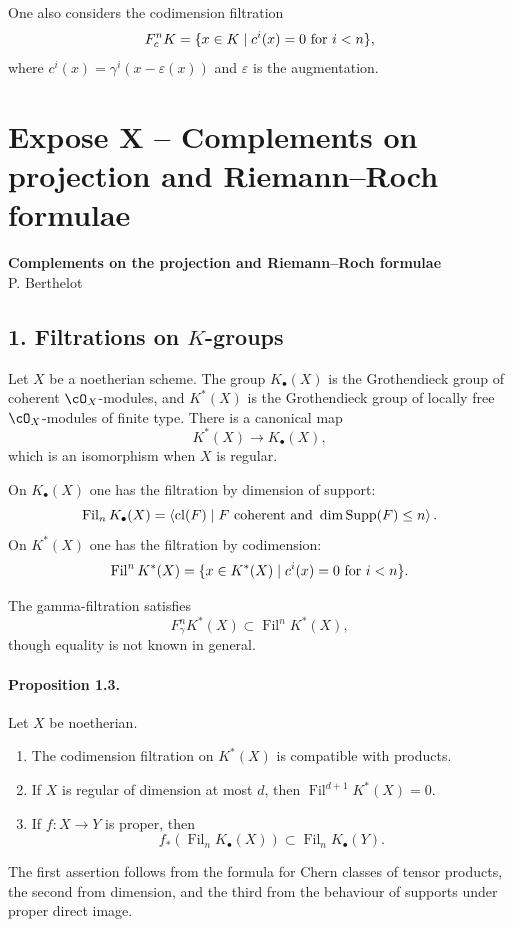 \documentclass[11pt]{article}
\theoremstyle{plain}
\theoremstyle{definition}
\theoremstyle{remark}
\DeclareMathOperator{\Supp}{Supp}
\DeclareMathOperator{\cl}{cl}
\newcommand{\longto}{\longrightarrow}
\providecommand{\eps}{\varepsilon}
\providecommand{\Filt}{\operatorname{Fil}}
\begin{document}
One also considers the codimension filtration
\[
F^n_cK=\{x\in K\mid c^i(x)=0\hbox{ for }i<n\},
\]
where $c^i(x)=\gamma^i(x-\eps(x))$ and $\eps$ is the augmentation.

\section*{Expose X -- Complements on projection and Riemann--Roch formulae}

\begin{center}
{\large\textbf{Complements on the projection and Riemann--Roch formulae}}\\[0.25em]
{\normalsize P. Berthelot}
\end{center}

\subsection*{1. Filtrations on $K$-groups}

Let $X$ be a noetherian scheme. The group $K_\bullet(X)$ is the Grothendieck group of coherent $\cO_X$-modules, and $K^*(X)$ is the Grothendieck group of locally free $\cO_X$-modules of finite type. There is a canonical map
\[
K^*(X)\longto K_\bullet(X),
\]
which is an isomorphism when $X$ is regular.

On $K_\bullet(X)$ one has the filtration by dimension of support:
\[
\Filt_nK_\bullet(X)=
\left\langle \cl(F)\mid F\hbox{ coherent and }\dim \Supp(F)\leq n\right\rangle.
\]
On $K^*(X)$ one has the filtration by codimension:
\[
\Filt^nK^*(X)=\{x\in K^*(X)\mid c^i(x)=0\hbox{ for }i<n\}.
\]

The gamma-filtration satisfies
\[
F^n_\gamma K^*(X)\subset \Filt^nK^*(X),
\]
though equality is not known in general.

\paragraph{Proposition 1.3.}
Let $X$ be noetherian.
\begin{enumerate}[label=\roman*)]
\item The codimension filtration on $K^*(X)$ is compatible with products.
\item If $X$ is regular of dimension at most $d$, then $\Filt^{d+1}K^*(X)=0$.
\item If $f:X\to Y$ is proper, then
\[
f_*(\Filt_nK_\bullet(X))\subset \Filt_nK_\bullet(Y).
\]
\end{enumerate}
The first assertion follows from the formula for Chern classes of tensor products, the second from dimension, and the third from the behaviour of supports under proper direct image.
\end{document}
